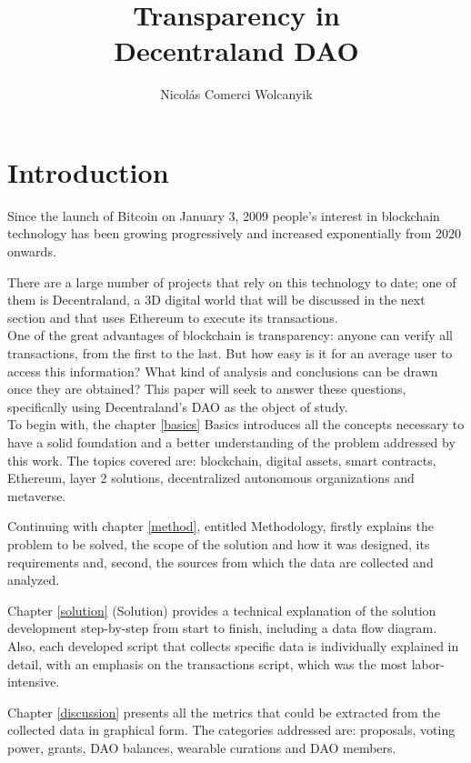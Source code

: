 \documentclass[MSE,Master,english]{twbook}%
\title{Transparency in\\Decentraland DAO}
\author{Nicol{\'a}s Comerci Wolcanyik}
\begin{document}
\maketitle

%
%
\chapter{Introduction\label{intro}}
Since the launch of Bitcoin on January 3, 2009 people's interest in blockchain technology has been growing progressively and increased exponentially from 2020 onwards. 

There are a large number of projects that rely on this technology to date; one of them is Decentraland, a 3D digital world that will be discussed in the next section and that uses Ethereum to execute its transactions. \\

One of the great advantages of blockchain is transparency: anyone can verify all transactions, from the first to the last. But how easy is it for an average user to access this information? What kind of analysis and conclusions can be drawn once they are obtained? This paper will seek to answer these questions, specifically using Decentraland's DAO as the object of study. \\

To begin with, the chapter \ref{basics} Basics introduces all the concepts necessary to have a solid foundation and a better understanding of the problem addressed by this work. The topics covered are: blockchain, digital assets, smart contracts, Ethereum, layer 2 solutions, decentralized autonomous organizations and metaverse.

Continuing with chapter \ref{method}, entitled Methodology, firstly explains the problem to be solved, the scope of the solution and how it was designed, its requirements and, second, the sources from which the data are collected and analyzed.

Chapter \ref{solution} (Solution) provides a technical explanation of the solution development step-by-step from start to finish, including a data flow diagram. Also, each developed script that collects specific data is individually explained in detail, with an emphasis on the transactions script, which was the most labor-intensive.

Chapter \ref{discussion} presents all the metrics that could be extracted from the collected data in graphical form. The categories addressed are: proposals, voting power, grants, DAO balances, wearable curations and DAO members.
\end{document}
